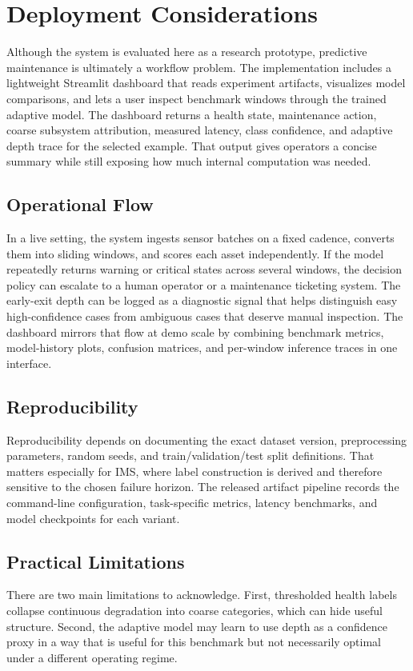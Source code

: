 \section{Deployment Considerations}
Although the system is evaluated here as a research prototype, predictive maintenance is ultimately a workflow problem. The implementation includes a lightweight Streamlit dashboard that reads experiment artifacts, visualizes model comparisons, and lets a user inspect benchmark windows through the trained adaptive model. The dashboard returns a health state, maintenance action, coarse subsystem attribution, measured latency, class confidence, and adaptive depth trace for the selected example. That output gives operators a concise summary while still exposing how much internal computation was needed.

\subsection{Operational Flow}
In a live setting, the system ingests sensor batches on a fixed cadence, converts them into sliding windows, and scores each asset independently. If the model repeatedly returns warning or critical states across several windows, the decision policy can escalate to a human operator or a maintenance ticketing system. The early-exit depth can be logged as a diagnostic signal that helps distinguish easy high-confidence cases from ambiguous cases that deserve manual inspection. The dashboard mirrors that flow at demo scale by combining benchmark metrics, model-history plots, confusion matrices, and per-window inference traces in one interface.

\subsection{Reproducibility}
Reproducibility depends on documenting the exact dataset version, preprocessing parameters, random seeds, and train/validation/test split definitions. That matters especially for IMS, where label construction is derived and therefore sensitive to the chosen failure horizon. The released artifact pipeline records the command-line configuration, task-specific metrics, latency benchmarks, and model checkpoints for each variant.

\subsection{Practical Limitations}
There are two main limitations to acknowledge. First, thresholded health labels collapse continuous degradation into coarse categories, which can hide useful structure. Second, the adaptive model may learn to use depth as a confidence proxy in a way that is useful for this benchmark but not necessarily optimal under a different operating regime.
